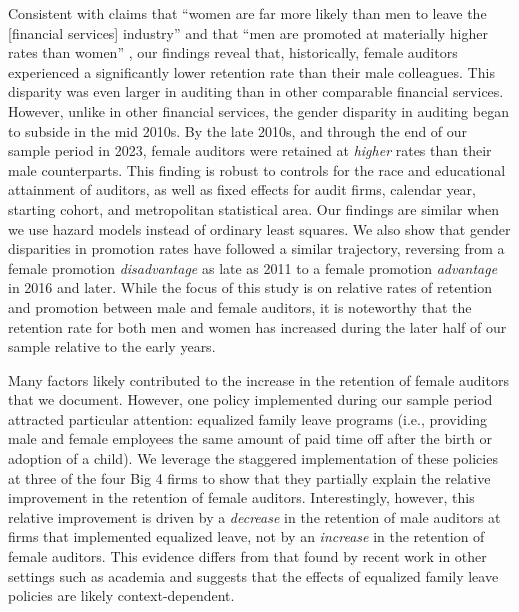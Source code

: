 \documentclass[11pt]{article}
\begin{document}
    Consistent with claims that ``women are far more likely than men to leave the [financial services] industry'' and that ``men are promoted at materially higher rates than women'' \parencite{jaekelWhyWomenArent2016}, our findings reveal that, historically, female auditors experienced a significantly lower retention rate than their male colleagues. This disparity was even larger in auditing than in other comparable financial services. However, unlike in other financial services, the gender disparity in auditing began to subside in the mid 2010s. By the late 2010s, and through the end of our sample period in 2023, female auditors were retained at \textit{higher} rates than their male counterparts. This finding is robust to controls for the race and educational attainment of auditors, as well as fixed effects for audit firms, calendar year, starting cohort, and metropolitan statistical area. Our findings are similar when we use hazard models instead of ordinary least squares. We also show that gender disparities in promotion rates have followed a similar trajectory, reversing from a female promotion \textit{disadvantage} as late as 2011 to a female promotion \textit{advantage} in 2016 and later. While the focus of this study is on relative rates of retention and promotion between male and female auditors, it is noteworthy that the retention rate for both men and women has increased during the later half of our sample relative to the early years.

    Many factors likely contributed to the increase in the retention of female auditors that we document. However, one policy implemented during our sample period attracted particular attention: equalized family leave programs (i.e., providing male and female employees the same amount of paid time off after the birth or adoption of a child). We leverage the staggered implementation of these policies at three of the four Big 4 firms to show that they partially explain the relative improvement in the retention of female auditors. Interestingly, however, this relative improvement is driven by a \textit{decrease} in the retention of male auditors at firms that implemented equalized leave, not by an \textit{increase} in the retention of female auditors. This evidence differs from that found by recent work in other settings such as academia \parencite{antecolEqualInequitableWho2018} and suggests that the effects of equalized family leave policies are likely context-dependent. 
    
\end{document}
